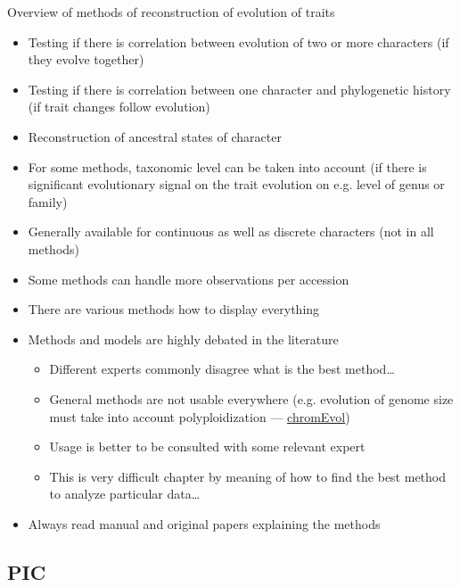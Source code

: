 \documentclass[compress, ucs, xelatex, 11pt, xcolor=svgnames,
	hyperref={
		bookmarks=true,
		unicode=true,
		colorlinks=true,
		pdftitle={Molecular data in R},
		plainpages=false,
		pdfauthor={Vojtech Zeisek},
		pdfsubject={Course about phylogeny and evolution in R},
		pdfcreator={XeLaTeX},
		pdfkeywords={R, evolution, phylogeny, molecular data},
		linkcolor=Tomato,
		anchorcolor=SaddleBrown,
		citecolor=Goldenrod,
		filecolor=DarkMagenta,
		menucolor=Sienna,
		urlcolor=DarkTurquoise,
		pdftex},
	url={hyphens, lowtilde} %
	]{beamer}
\begin{document}
\begin{frame}[allowframebreaks]{Overview of methods of reconstruction of evolution of traits}
	\begin{itemize}
		\item Testing if there is correlation between evolution of two or more characters (if they evolve together)
		\item Testing if there is correlation between one character and phylogenetic history (if trait changes follow evolution)
		\item Reconstruction of ancestral states of character
		\item For some methods, taxonomic level can be taken into account (if there is significant evolutionary signal on the trait evolution on e.g. level of genus or family)
		\item Generally available for continuous as well as discrete characters (not in all methods)
		\item Some methods can handle more observations per accession
		\item There are various methods how to display everything
		\item Methods and models are highly debated in the literature
		\begin{itemize}
			\item Different experts commonly disagree what is the best method\ldots
			\item General methods are not usable everywhere (e.g. evolution of genome size must take into account polyploidization --- \href{https://www.tau.ac.il/~itaymay/cp/chromEvol/}{chromEvol})
			\item Usage is better to be consulted with some relevant expert
			\item This is very difficult chapter by meaning of how to find the best method to analyze particular data\ldots
		\end{itemize}
		\item Always read manual and original papers explaining the methods
	\end{itemize}
\end{frame}

\subsection{PIC}
\end{document}
